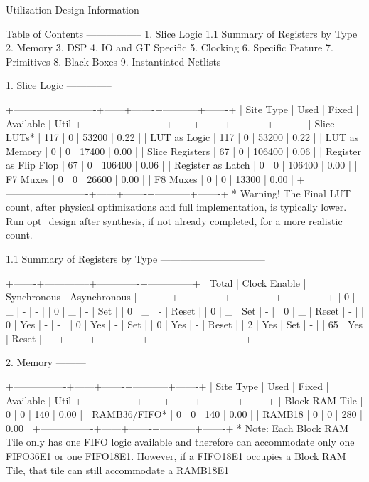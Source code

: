 \documentclass{article}
\begin{document}
Utilization Design Information

Table of Contents
-----------------
1. Slice Logic
1.1 Summary of Registers by Type
2. Memory
3. DSP
4. IO and GT Specific
5. Clocking
6. Specific Feature
7. Primitives
8. Black Boxes
9. Instantiated Netlists

1. Slice Logic
--------------

+-------------------------+------+-------+-----------+-------+
|        Site Type        | Used | Fixed | Available | Util%
+-------------------------+------+-------+-----------+-------+
| Slice LUTs*             |  117 |     0 |     53200 |  0.22 |
|   LUT as Logic          |  117 |     0 |     53200 |  0.22 |
|   LUT as Memory         |    0 |     0 |     17400 |  0.00 |
| Slice Registers         |   67 |     0 |    106400 |  0.06 |
|   Register as Flip Flop |   67 |     0 |    106400 |  0.06 |
|   Register as Latch     |    0 |     0 |    106400 |  0.00 |
| F7 Muxes                |    0 |     0 |     26600 |  0.00 |
| F8 Muxes                |    0 |     0 |     13300 |  0.00 |
+-------------------------+------+-------+-----------+-------+
* Warning! The Final LUT count, after physical optimizations and full implementation, is typically lower. Run opt_design after synthesis, if not already completed, for a more realistic count.


1.1 Summary of Registers by Type
--------------------------------

+-------+--------------+-------------+--------------+
| Total | Clock Enable | Synchronous | Asynchronous |
+-------+--------------+-------------+--------------+
| 0     |            _ |           - |            - |
| 0     |            _ |           - |          Set |
| 0     |            _ |           - |        Reset |
| 0     |            _ |         Set |            - |
| 0     |            _ |       Reset |            - |
| 0     |          Yes |           - |            - |
| 0     |          Yes |           - |          Set |
| 0     |          Yes |           - |        Reset |
| 2     |          Yes |         Set |            - |
| 65    |          Yes |       Reset |            - |
+-------+--------------+-------------+--------------+


2. Memory
---------

+----------------+------+-------+-----------+-------+
|    Site Type   | Used | Fixed | Available | Util%
+----------------+------+-------+-----------+-------+
| Block RAM Tile |    0 |     0 |       140 |  0.00 |
|   RAMB36/FIFO* |    0 |     0 |       140 |  0.00 |
|   RAMB18       |    0 |     0 |       280 |  0.00 |
+----------------+------+-------+-----------+-------+
* Note: Each Block RAM Tile only has one FIFO logic available and therefore can accommodate only one FIFO36E1 or one FIFO18E1. However, if a FIFO18E1 occupies a Block RAM Tile, that tile can still accommodate a RAMB18E1
\end{document}
